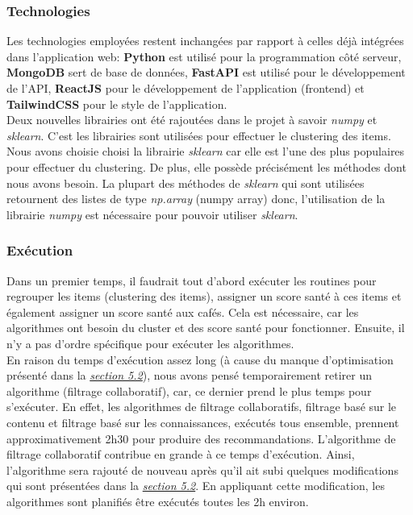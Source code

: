 \documentclass[11pt]{article}
\begin{document}
\subsubsection{Technologies}
Les technologies employées restent inchangées par rapport à celles déjà intégrées dans l'application web:
\textbf{Python} est utilisé pour la programmation côté serveur, \textbf{MongoDB} sert de base de données, \textbf{FastAPI} 
est utilisé pour le développement de l'API, \textbf{ReactJS} pour le développement de l'application (frontend) et 
\textbf{TailwindCSS} pour le style de l'application.\\


Deux nouvelles librairies ont été rajoutées dans le projet à savoir \textit{numpy} et \textit{sklearn}. C'est les librairies sont utilisées pour effectuer le clustering des items. Nous avons choisie choisi la librairie \textit{sklearn} car elle est l'une des plus populaires pour effectuer du clustering. De plus, elle possède précisément les méthodes dont nous avons besoin. La plupart des méthodes de \textit{sklearn} qui sont utilisées retournent des listes de type \textit{np.array} (numpy array) donc, l'utilisation de la librairie \textit{numpy} est nécessaire pour pouvoir utiliser \textit{sklearn}.

\subsubsection{Exécution}
Dans un premier temps, il faudrait tout d'abord exécuter les routines pour regrouper les items (clustering des items), assigner un score santé à ces items et également assigner un score santé aux cafés. Cela est nécessaire, car les algorithmes ont besoin du cluster et des score santé pour fonctionner. Ensuite, il n'y a pas d'ordre spécifique pour exécuter les algorithmes.\\

En raison du temps d'exécution assez long (à cause du manque d'optimisation présenté dans la \hyperref[discussion]{\textit{section 5.2}}), nous avons pensé temporairement retirer un algorithme (filtrage collaboratif), car, ce dernier prend le plus temps pour s'exécuter. En effet, les algorithmes de filtrage collaboratifs, filtrage basé sur le contenu et filtrage basé sur les connaissances, exécutés tous ensemble, prennent approximativement 2h30 pour produire des recommandations. L'algorithme de filtrage collaboratif contribue en grande à ce temps d'exécution. Ainsi, l'algorithme sera rajouté de nouveau après qu'il ait subi quelques modifications qui sont présentées dans la \hyperref[discussion]{\textit{section 5.2}}. En appliquant cette modification, les algorithmes sont planifiés être exécutés toutes les 2h environ.
\end{document}
